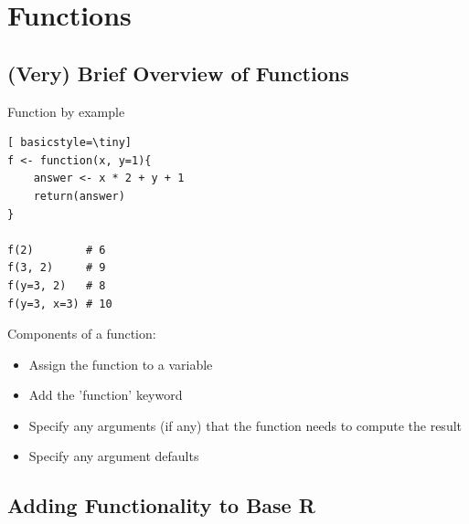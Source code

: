 \section[Functions]{Functions}
\subsection{(Very) Brief Overview of Functions}
\begin{frame}[fragile]
	\begin{center}
		\begin{block}{Function by example}
			\begin{lstlisting}[ basicstyle=\tiny]
f <- function(x, y=1){
	answer <- x * 2 + y + 1
	return(answer)
}

f(2)        # 6
f(3, 2)     # 9
f(y=3, 2)   # 8
f(y=3, x=3) # 10
			\end{lstlisting}	
		\end{block}

		\begin{block}{Components of a function:}
			\begin{itemize}
				\item Assign the function to a variable
				\item Add the 'function' keyword
				\item Specify any arguments (if any) that the function needs to compute the result
				\item Specify any argument defaults
			\end{itemize}
		\end{block}
	\end{center} 
\end{frame}

\subsection{Adding Functionality to Base R}

\begin{frame}
	\begin{center}
	\end{center} 
\end{frame}






